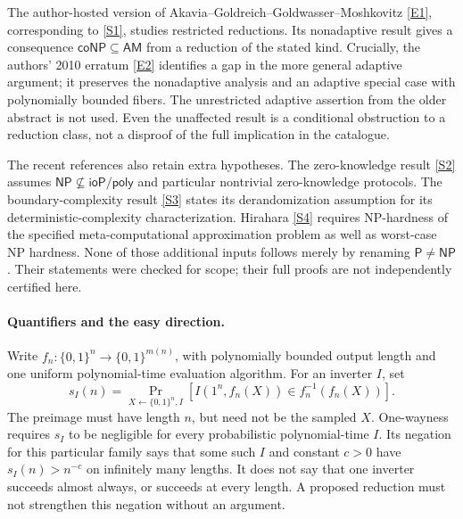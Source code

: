 \documentclass[11pt]{article}
\begin{document}
The author-hosted version of Akavia--Goldreich--Goldwasser--Moshkovitz
\href{https://people.csail.mit.edu/akavia/2006-stocAGGM.pdf}{[E1]}, corresponding to \href{https://api.openalex.org/works/doi:10.1145/1132516.1132614}{[S1]}, studies restricted reductions. Its nonadaptive
result gives a consequence $\mathsf{coNP}\subseteq\mathsf{AM}$ from a reduction
of the stated kind. Crucially, the authors' 2010 erratum \href{https://people.csail.mit.edu/akavia/AGGM_errata.pdf}{[E2]} identifies a
gap in the more general adaptive argument; it preserves the nonadaptive
analysis and an adaptive special case with polynomially bounded fibers.
The unrestricted adaptive assertion from the older abstract is not used.
Even the unaffected result is a conditional obstruction to a reduction
class, not a disproof of the full implication in the catalogue.

The recent references also retain extra hypotheses. The zero-knowledge
result \href{https://arxiv.org/abs/2602.17651}{[S2]} assumes $\mathsf{NP}\not\subseteq\mathsf{ioP/poly}$ and particular
nontrivial zero-knowledge protocols. The boundary-complexity result \href{https://eccc.weizmann.ac.il/report/2025/125/}{[S3]}
states its derandomization assumption for its deterministic-complexity
characterization. Hirahara \href{https://eccc.weizmann.ac.il/report/2023/037/}{[S4]} requires NP-hardness of the specified
meta-computational approximation problem as well as worst-case NP hardness.
None of those additional inputs follows merely by renaming
$\mathsf P\ne\mathsf{NP}$. Their statements were checked for scope; their
full proofs are not independently certified here.

\paragraph{Quantifiers and the easy direction.}
Write $f_n:\{0,1\}^n\to\{0,1\}^{m(n)}$, with polynomially bounded output
length and one uniform polynomial-time evaluation algorithm. For an inverter
$I$, set
\[
 s_I(n)=\Pr_{X\leftarrow\{0,1\}^n,I}
       [I(1^n,f_n(X))\in f_n^{-1}(f_n(X))].
\]
The preimage must have length $n$, but need not be the sampled $X$.
One-wayness requires $s_I$ to be negligible for every probabilistic
polynomial-time $I$. Its negation for this particular family says that
some such $I$ and constant $c>0$ have $s_I(n)>n^{-c}$ on infinitely many
lengths. It does not say that one inverter succeeds almost always, or
succeeds at every length. A proposed reduction must not strengthen this
negation without an argument.
\end{document}
